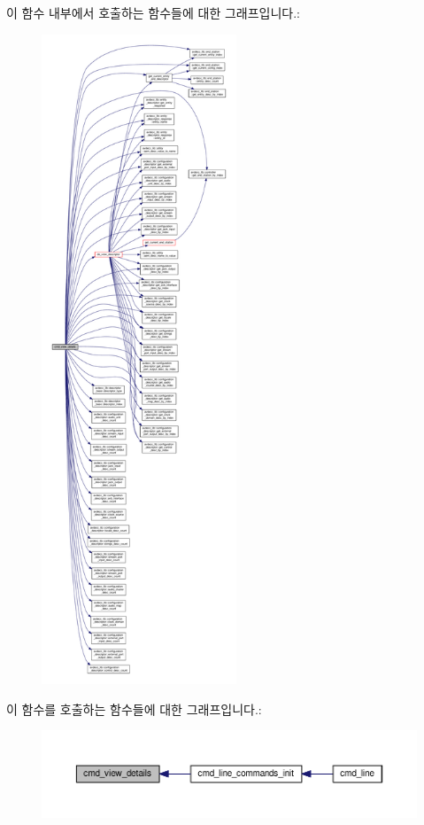 이 함수 내부에서 호출하는 함수들에 대한 그래프입니다.\+:
\nopagebreak
\begin{figure}[H]
\begin{center}
\leavevmode
\includegraphics[height=550pt]{classcmd__line_afb1e2fe0ed7b269ad35069f573452766_cgraph}
\end{center}
\end{figure}




이 함수를 호출하는 함수들에 대한 그래프입니다.\+:
\nopagebreak
\begin{figure}[H]
\begin{center}
\leavevmode
\includegraphics[width=350pt]{classcmd__line_afb1e2fe0ed7b269ad35069f573452766_icgraph}
\end{center}
\end{figure}


